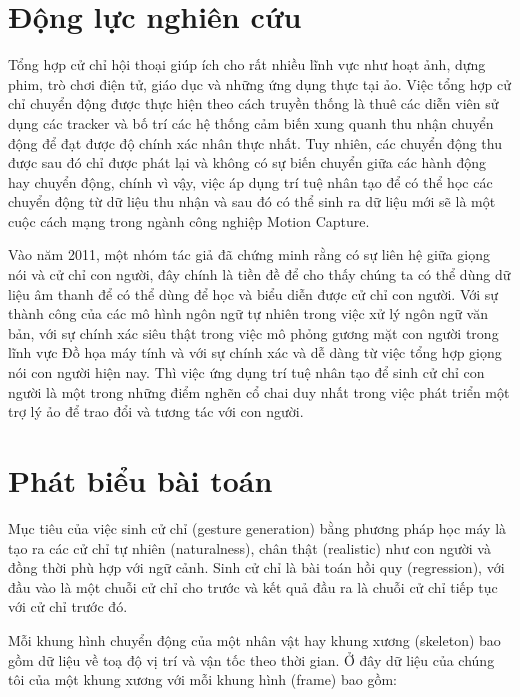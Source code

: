 \section{Động lực nghiên cứu}

Tổng hợp cử chỉ hội thoại giúp ích cho rất nhiều lĩnh vực như hoạt ảnh, dựng phim, trò chơi điện tử, giáo dục và những ứng dụng thực tại ảo. Việc tổng hợp cử chỉ chuyển động được thực hiện theo cách truyền thống là thuê các diễn viên sử dụng các tracker và bố trí các hệ thống cảm biến xung quanh thu nhận chuyển động để đạt được độ chính xác nhân thực nhất. Tuy nhiên, các chuyển động thu được sau đó chỉ được phát lại và không có sự biến chuyển giữa các hành động hay chuyển động, chính vì vậy, việc áp dụng trí tuệ nhân tạo để có thể học các chuyển động từ dữ liệu thu nhận và sau đó có thể sinh ra dữ liệu mới sẽ là một cuộc cách mạng trong ngành công nghiệp Motion Capture.

Vào năm 2011, một nhóm tác giả \cite{bergmann2011relation} đã chứng minh rằng có sự liên hệ giữa giọng nói và cử chỉ con người, đây chính là tiền đề để cho thấy chúng ta có thể dùng dữ liệu âm thanh để có thể dùng để học và biểu diễn được cử chỉ con người.
Với sự thành công của các mô hình ngôn ngữ tự nhiên trong việc xử lý ngôn ngữ văn bản, với sự chính xác siêu thật trong việc mô phỏng gương mặt con người trong lĩnh vực Đồ họa máy tính và với sự chính xác và dễ dàng từ việc tổng hợp giọng nói con người hiện nay. Thì việc ứng dụng trí tuệ nhân tạo để sinh cử chỉ con người là một trong những điểm nghẽn cổ chai duy nhất trong việc phát triển một trợ lý ảo để trao đổi và tương tác với con người.

\section{Phát biểu bài toán}

Mục tiêu của việc sinh cử chỉ (gesture generation) bằng phương pháp học máy là tạo ra các cử chỉ tự nhiên (naturalness), chân thật (realistic) như con người và đồng thời phù hợp với ngữ cảnh.
Sinh cử chỉ là bài toán hồi quy (regression), với đầu vào là một chuỗi cử chỉ cho trước và kết quả đầu ra là chuỗi cử chỉ tiếp tục với cử chỉ trước đó.

Mỗi khung hình chuyển động của một nhân vật hay khung xương (skeleton) bao gồm dữ liệu về toạ độ vị trí và vận tốc theo thời gian.
Ở đây dữ liệu của chúng tôi của một khung xương với mỗi khung hình (frame) bao gồm:

